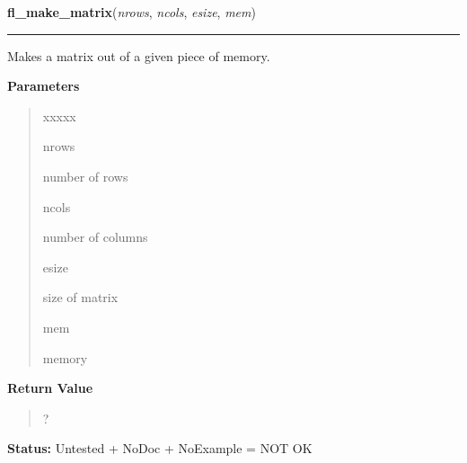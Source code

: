     \vspace{0.5ex}

\hspace{.8\funcindent}\begin{boxedminipage}{\funcwidth}

    \raggedright \textbf{fl\_make\_matrix}(\textit{nrows}, \textit{ncols}, \textit{esize}, \textit{mem})

    \vspace{-1.5ex}

    \rule{\textwidth}{0.5\fboxrule}
\setlength{\parskip}{2ex}
    Makes a matrix out of a given piece of memory.

\setlength{\parskip}{1ex}
      \textbf{Parameters}
      \vspace{-1ex}

      \begin{quote}
        \begin{Ventry}{xxxxx}

          \item[nrows]

          number of rows

          \item[ncols]

          number of columns

          \item[esize]

          size of matrix

          \item[mem]

          memory

        \end{Ventry}

      \end{quote}

      \textbf{Return Value}
    \vspace{-1ex}

      \begin{quote}
      ?

      \end{quote}

\textbf{Status:} Untested + NoDoc + NoExample = NOT OK



    \end{boxedminipage}

    \label{xformslib:library:fl_free_matrix}


